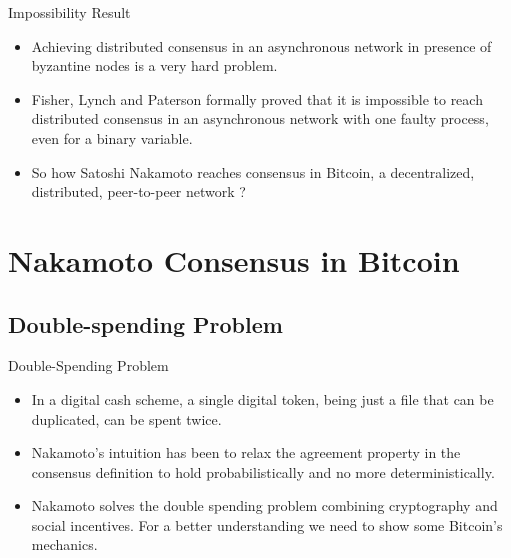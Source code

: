 \documentclass[usenames,dvipsnames]{beamer}
\begin{document}
        \begin{frame}{Impossibility Result}
            
            \begin{itemize}
                \item Achieving \alert{distributed consensus} in an asynchronous network in presence of byzantine nodes is a very \alert{hard problem}.
                \item Fisher, Lynch and Paterson \cite{Fischer:1985:IDC:3149.214121} formally proved that it is \alert{impossible} to reach distributed consensus in an asynchronous network with \alert{one faulty process}, even for a \alert{binary} variable.
                \item So how Satoshi Nakamoto reaches consensus in \alert{Bitcoin}, a decentralized, distributed, peer-to-peer network ?
            \end{itemize}
            
        \end{frame}
    
    \section{Nakamoto Consensus in Bitcoin}
    \subsection{Double-spending Problem}
    \begin{frame}{Double-Spending Problem}
        \begin{itemize}
            \item In a digital cash scheme, a \alert{single digital token}, being just a file that can be duplicated, can be \alert{spent twice}.
            \item Nakamoto's intuition has been to relax the \alert{agreement} property in the consensus definition to hold \alert{probabilistically} and no more \alert{deterministically}.
            \item Nakamoto solves the \alert{double spending problem} combining \alert{cryptography} and \alert{social incentives}. For a better understanding we need to show some Bitcoin's mechanics.
            \end{itemize}
    \end{frame}
\end{document}
